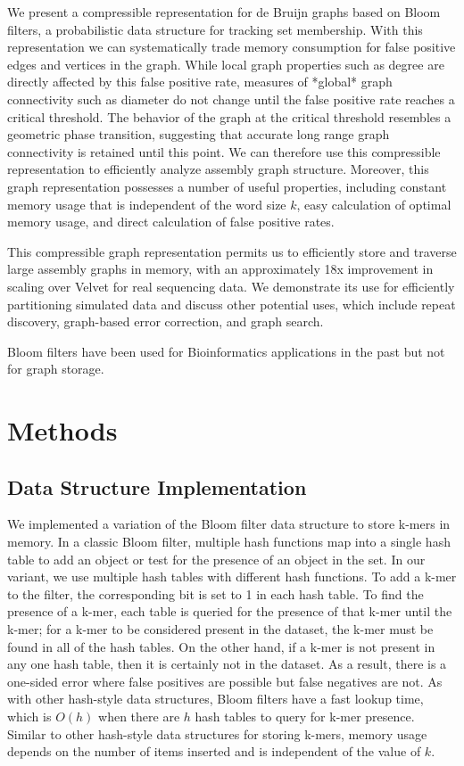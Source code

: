 \documentclass[12pt]{article} \usepackage{simplemargins}
\begin{document}
We present a compressible representation for de Bruijn graphs based on
Bloom filters, a probabilistic data structure for tracking set
membership.  With this representation we can systematically trade
memory consumption for false positive edges and vertices in the graph.
While local graph properties such as degree are directly affected by
this false positive rate, measures of *global* graph connectivity such
as diameter do not change until the false positive rate reaches a
critical threshold.  The behavior of the graph at the critical
threshold resembles a geometric phase transition, suggesting that
accurate long range graph connectivity is retained until this point.
We can therefore use this compressible representation to efficiently
analyze assembly graph structure.  Moreover, this graph representation
possesses a number of useful properties, including constant memory
usage that is independent of the word size $k$, easy calculation of
optimal memory usage, and direct calculation of false positive rates.

This compressible graph representation permits us to efficiently store
and traverse large assembly graphs in memory, with an approximately
18x improvement in scaling over Velvet for real sequencing data.  We
demonstrate its use for efficiently partitioning simulated data and
discuss other potential uses, which include repeat discovery,
graph-based error correction, and graph search.

Bloom filters\cite{bloom} have been used for 
Bioinformatics applications 
in the past\cite{pmid20472541, haskell, pmid20426693} but not for graph 
storage.

\section{Methods}

\subsection{Data Structure Implementation}
We implemented a variation of the Bloom filter data structure to store k-mers
in memory. In a classic Bloom filter, multiple hash functions map into 
a single hash table to add an object or test for the presence of an object 
in the set. In 
our variant, we use multiple hash tables with different hash functions. 
To add a k-mer to the filter, the corresponding bit is set to 1 
in each hash table.  
To find the presence of a k-mer, each table is queried for the
presence of that k-mer until the k-mer; for a k-mer to be considered 
present in the dataset, 
the k-mer must be found in all of the hash tables. On the other hand, 
if a k-mer is not present in any one hash table, then it is certainly 
not in the dataset. As a result, there is a one-sided error where 
false positives are possible but false negatives are not. As with other 
hash-style data structures, Bloom filters have a
fast lookup time, which is $O(h)$ when there are $h$ hash tables to query
for k-mer presence. Similar to other hash-style data structures for 
storing k-mers, memory usage depends on the number of items inserted 
and is independent of the value of $k$. 
\end{document}
